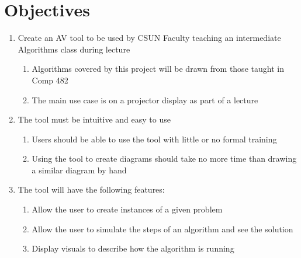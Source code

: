 \section{Objectives}
\begin{enumerate}
	\item Create an AV tool to be used by CSUN Faculty 
		teaching an intermediate Algorithms class during lecture
		\begin{enumerate}
			\item Algorithms covered by this project will be drawn from 
				those taught in Comp 482
			\item The main use case is on a projector display as part of a lecture
		\end{enumerate}
	\item The tool must be intuitive and easy to use
		\begin{enumerate}
			\item Users should be able to use the tool with little or no 
				formal training
			\item Using the tool to create diagrams should take no more time 
				than drawing a similar diagram by hand
		\end{enumerate}
	\item The tool will have the following features:
	\begin{enumerate}
		\item Allow the user to create instances of a given problem
		\item Allow the user to simulate the steps of an algorithm 
			and see the solution
		\item Display visuals to describe how the algorithm is running
	\end{enumerate}
\end{enumerate}
